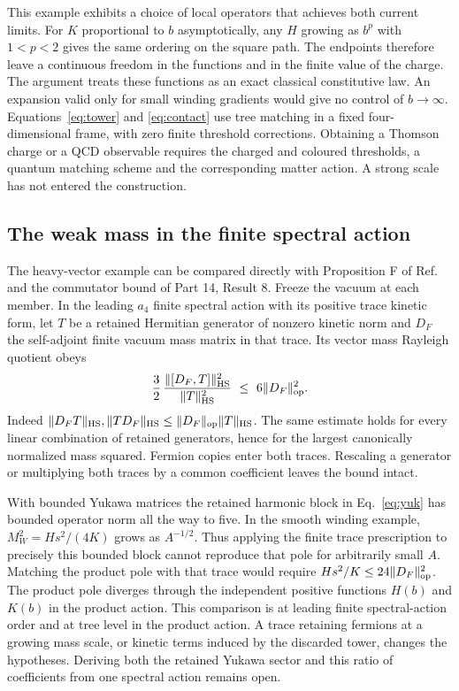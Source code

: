 \documentclass[aps,prd,reprint,onecolumn,nofootinbib,amsmath,amssymb]{revtex4-2}
\begin{document}
This example exhibits a choice of local operators that achieves both current limits. For $K$ proportional to $b$ asymptotically, any $H$ growing as $b^p$ with $1<p<2$ gives the same ordering on the square path. The endpoints therefore leave a continuous freedom in the functions and in the finite value of the charge. The argument treats these functions as an exact classical constitutive law. An expansion valid only for small winding gradients would give no control of $b\to\infty$. Equations~\eqref{eq:tower} and \eqref{eq:contact} use tree matching in a fixed four-dimensional frame, with zero finite threshold corrections. Obtaining a Thomson charge or a QCD observable requires the charged and coloured thresholds, a quantum matching scheme and the corresponding matter action. A strong scale has not entered the construction.

\subsection{The weak mass in the finite spectral action}
The heavy-vector example can be compared directly with Proposition F of Ref.~\cite{towerlesspaper} and the commutator bound of Part 14, Result 8. Freeze the vacuum at each member. In the leading $a_4$ finite spectral action with its positive trace kinetic form, let $T$ be a retained Hermitian generator of nonzero kinetic norm and $D_F$ the self-adjoint finite vacuum mass matrix in that trace. Its vector mass Rayleigh quotient obeys
\begin{equation}
 \frac32\,
 \frac{\|[D_F,T]\|_{\rm HS}^2}{\|T\|_{\rm HS}^2}
 \ \leq\ 6\|D_F\|_{\rm op}^2 .
 \label{eq:tracebound}
\end{equation}
Indeed $\|D_F T\|_{\rm HS},\|T D_F\|_{\rm HS}\leq\|D_F\|_{\rm op}\|T\|_{\rm HS}$. The same estimate holds for every linear combination of retained generators, hence for the largest canonically normalized mass squared. Fermion copies enter both traces. Rescaling a generator or multiplying both traces by a common coefficient leaves the bound intact.

With bounded Yukawa matrices the retained harmonic block in Eq.~\eqref{eq:yuk} has bounded operator norm all the way to five. In the smooth winding example, $M_W^2=Hs^2/(4K)$ grows as $A^{-1/2}$. Thus applying the finite trace prescription to precisely this bounded block cannot reproduce that pole for arbitrarily small $A$. Matching the product pole with that trace would require $Hs^2/K\le24\|D_F\|_{\rm op}^2$. The product pole diverges through the independent positive functions $H(b)$ and $K(b)$ in the product action. This comparison is at leading finite spectral-action order and at tree level in the product action. A trace retaining fermions at a growing mass scale, or kinetic terms induced by the discarded tower, changes the hypotheses. Deriving both the retained Yukawa sector and this ratio of coefficients from one spectral action remains open.
\end{document}
